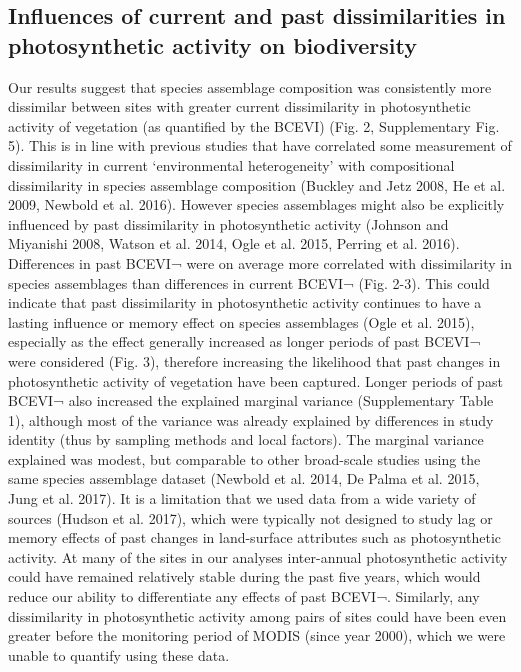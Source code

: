 \subsection{Influences of current and past dissimilarities in photosynthetic activity on biodiversity}
Our results suggest that species assemblage composition was consistently more dissimilar between sites with greater current dissimilarity in photosynthetic activity of vegetation (as quantified by the BCEVI) (Fig. 2, Supplementary Fig. 5). This is in line with previous studies that have correlated some measurement of dissimilarity in current ‘environmental heterogeneity’ with compositional dissimilarity in species assemblage composition (Buckley and Jetz 2008, He et al. 2009, Newbold et al. 2016). However species assemblages might also be explicitly influenced by past dissimilarity in photosynthetic activity (Johnson and Miyanishi 2008, Watson et al. 2014, Ogle et al. 2015, Perring et al. 2016). 
	Differences in past BCEVI¬ were on average more correlated with dissimilarity in species assemblages than differences in current BCEVI¬ (Fig. 2-3). This could indicate that past dissimilarity in photosynthetic activity continues to have a lasting influence or memory effect on species assemblages (Ogle et al. 2015), especially as the effect generally increased as longer periods of past BCEVI¬ were considered (Fig. 3), therefore increasing the likelihood that past changes in photosynthetic activity of vegetation have been captured. Longer periods of past BCEVI¬ also increased the explained marginal variance (Supplementary Table 1), although most of the variance was already explained by differences in study identity (thus by sampling methods and local factors). The marginal variance explained was modest, but comparable to other broad-scale studies using the same species assemblage dataset (Newbold et al. 2014, De Palma et al. 2015, Jung et al. 2017). It is a limitation that we used data from a wide variety of sources (Hudson et al. 2017), which were typically not designed to study lag or memory effects of past changes in land-surface attributes such as photosynthetic activity. At many of the sites in our analyses inter-annual photosynthetic activity could have remained relatively stable during the past five years, which would reduce our ability to differentiate any effects of past BCEVI¬. Similarly, any dissimilarity in photosynthetic activity among pairs of sites could have been even greater before the monitoring period of MODIS (since year 2000), which we were unable to quantify using these data. 
